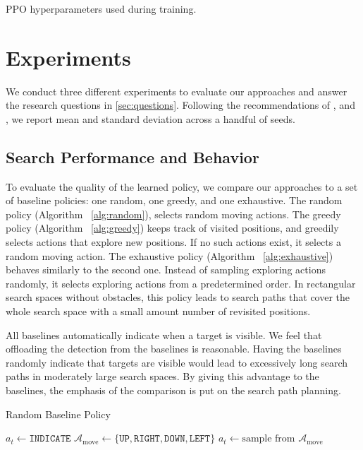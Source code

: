 \begin{table}
    \centering
    \caption[PPO hyperparameters]{PPO hyperparameters used during training.}
    
    \label{tab:hyperparameters}
\end{table}

\section{Experiments}
\label{sec:experiments}

We conduct three different experiments to evaluate our approaches and answer the research questions in \ref{sec:questions}. 
Following the recommendations of \cite{henderson_matters_2018}, \cite{colas_hitchhiker_2019} and \cite{agarwal_rlliable_2022}, we report mean and standard deviation across a handful of seeds.

\subsection{Search Performance and Behavior}

To evaluate the quality of the learned policy, we compare our approaches to a set of baseline policies: one random, one greedy, and one exhaustive.
The random policy (Algorithm ~\ref{alg:random}), selects random moving actions.
The greedy policy (Algorithm ~\ref{alg:greedy}) keeps track of visited positions, and greedily selects actions that explore new positions.
If no such actions exist, it selects a random moving action.
The exhaustive policy (Algorithm ~\ref{alg:exhaustive}) behaves similarly to the second one.
Instead of sampling exploring actions randomly, it selects exploring actions from a predetermined order.
In rectangular search spaces without obstacles, this policy leads to search paths that cover the whole search space with a small amount number of revisited positions.

All baselines automatically indicate when a target is visible.
We feel that offloading the detection from the baselines is reasonable.
Having the baselines randomly indicate that targets are visible would lead to excessively long search paths in moderately large search spaces.
By giving this advantage to the baselines, the emphasis of the comparison is put on the search path planning.

\begin{algorithm}
    \caption{Random Baseline Policy}
    \label{alg:random}
    \begin{algorithmic}
            \State \(a_t \leftarrow \mathtt{INDICATE}\)
        \Else
            \State \(\mathcal{A}_{\text{move}} \leftarrow \{\mathtt{UP}, \mathtt{RIGHT}, \mathtt{DOWN}, \mathtt{LEFT}\}\)
            \State \(a_t \leftarrow \text{sample from } \mathcal{A}_{\text{move}}\)
        \EndIf
    \end{algorithmic}
\end{algorithm}

